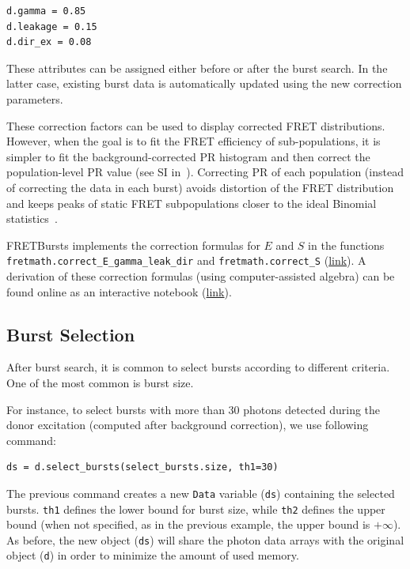 \documentclass[10pt,letterpaper]{article}
\begin{document}
\begin{lstlisting}
d.gamma = 0.85
d.leakage = 0.15
d.dir_ex = 0.08
\end{lstlisting}

These attributes can be assigned either before or after the burst search. In the
latter case, existing burst data is automatically updated using the new
correction parameters.

These correction factors can be used to display corrected FRET distributions.
However, when the goal is to fit the FRET efficiency of sub-populations,
it is simpler to fit the background-corrected
PR histogram and then correct the population-level PR value (see SI in~\cite{Lee_2005}).
Correcting PR of each population (instead of correcting the data in each burst)
avoids distortion of the FRET distribution and keeps peaks of
static FRET subpopulations closer to the ideal Binomial statistics~\cite{Gopich_2007}.

FRETBursts implements the correction formulas for $E$ and $S$ in the functions
\verb|fretmath.correct_E_gamma_leak_dir| and \verb|fretmath.correct_S|
(\href{http://fretbursts.readthedocs.org/en/latest/fretmath.html}{link}).
A derivation of these correction formulas (using computer-assisted algebra)
can be found online as an interactive notebook (\href{http://nbviewer.jupyter.org/github/tritemio/notebooks/blob/master/Derivation%20of%20FRET%20and%20S%20correction%20formulas.ipynb}{link}).


\subsection{Burst Selection}
\label{sec:burstsel}

After burst search, it is common to select bursts according to different
criteria. One of the most common is burst size.

For instance, to select bursts with more than 30 photons detected during the donor excitation 
(computed after background correction), we use following command:

\begin{lstlisting}
ds = d.select_bursts(select_bursts.size, th1=30)
\end{lstlisting}

The previous command creates a new \verb|Data| variable (\verb|ds|) containing
the selected bursts. \verb|th1| defines the lower bound for burst size, while 
\verb|th2| defines the upper bound (when not specified, as in the previous example,
the upper bound is $+\infty$).
As before, the new object (\verb|ds|) will share the photon data
arrays with the original object (\verb|d|) in order to minimize the amount 
of used memory.
\end{document}
